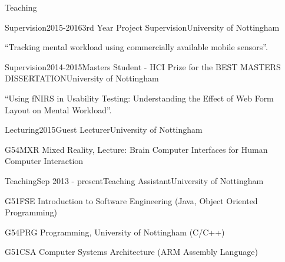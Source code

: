 \documentclass{resume} %
\begin{document}
\begin{rSection}{Teaching}
    \begin{rSubsection}{Supervision}{2015-2016}{3rd Year Project Supervision}{University of Nottingham}
        \item  ``Tracking mental workload using commercially available mobile sensors''.
    \end{rSubsection}

    \begin{rSubsection}{Supervision}{2014-2015}{Masters Student - HCI Prize for the BEST MASTERS DISSERTATION}{University of Nottingham}
        \item  ``Using fNIRS in Usability Testing: Understanding the Effect of Web Form Layout on Mental Workload''.
    \end{rSubsection}

    \begin{rSubsection}{Lecturing}{2015}{Guest Lecturer}{University of Nottingham}
        \item G54MXR Mixed Reality, Lecture: Brain Computer Interfaces for Human Computer Interaction
    \end{rSubsection}

    \begin{rSubsection}{Teaching}{Sep 2013 - present}{Teaching Assistant}{University of Nottingham}
        \item G51FSE Introduction to Software Engineering (Java, Object Oriented Programming)
        \item G54PRG Programming, University of Nottingham (C/C++)
        \item G51CSA Computer Systems Architecture (ARM Assembly Language)
    \end{rSubsection}
\end{rSection}
\end{document}
